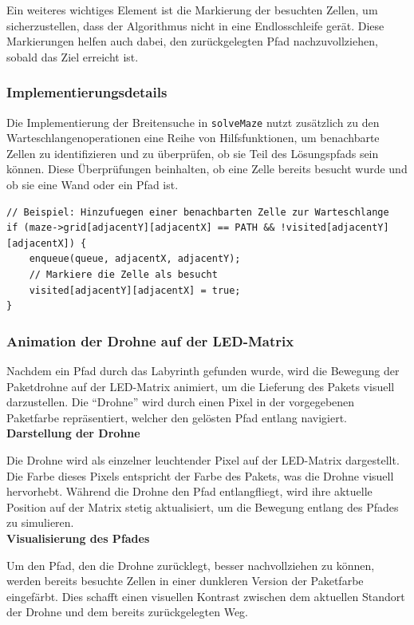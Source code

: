 Ein weiteres wichtiges Element ist die Markierung der besuchten Zellen, um sicherzustellen, dass der Algorithmus nicht in eine Endlosschleife gerät. Diese Markierungen helfen auch dabei, den zurückgelegten Pfad nachzuvollziehen, sobald das Ziel erreicht ist.

\subsubsection{Implementierungsdetails}

Die Implementierung der Breitensuche in \texttt{solveMaze} nutzt zusätzlich zu den Warteschlangenoperationen eine Reihe von Hilfsfunktionen, um benachbarte Zellen zu identifizieren und zu überprüfen, ob sie Teil des Lösungspfads sein können. Diese Überprüfungen beinhalten, ob eine Zelle bereits besucht wurde und ob sie eine Wand oder ein Pfad ist.

\begin{lstlisting}[style=CStyle]
// Beispiel: Hinzufuegen einer benachbarten Zelle zur Warteschlange
if (maze->grid[adjacentY][adjacentX] == PATH && !visited[adjacentY][adjacentX]) {
    enqueue(queue, adjacentX, adjacentY);
    // Markiere die Zelle als besucht
    visited[adjacentY][adjacentX] = true;
}
\end{lstlisting}

\subsubsection{Animation der Drohne auf der LED-Matrix}

Nachdem ein Pfad durch das Labyrinth gefunden wurde, wird die Bewegung der Paketdrohne auf der LED-Matrix animiert, um die Lieferung des Pakets visuell darzustellen. Die “Drohne” wird durch einen Pixel in der vorgegebenen Paketfarbe repräsentiert, welcher den gelösten Pfad entlang navigiert. \\

\noindent \textbf{Darstellung der Drohne}

Die Drohne wird als einzelner leuchtender Pixel auf der LED-Matrix dargestellt. Die Farbe dieses Pixels entspricht der Farbe des Pakets, was die Drohne visuell hervorhebt. Während die Drohne den Pfad entlangfliegt, wird ihre aktuelle Position auf der Matrix stetig aktualisiert, um die Bewegung entlang des Pfades zu simulieren. \\

\noindent \textbf{Visualisierung des Pfades}

Um den Pfad, den die Drohne zurücklegt, besser nachvollziehen zu können, werden bereits besuchte Zellen in einer dunkleren Version der Paketfarbe eingefärbt. Dies schafft einen visuellen Kontrast zwischen dem aktuellen Standort der Drohne und dem bereits zurückgelegten Weg. \\

